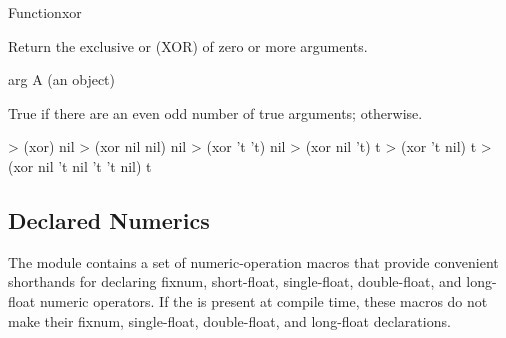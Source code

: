 \documentclass[10pt,twoside,english,pdftex]{article}
\begin{document}

\begin{functiondoc}{Function}{xor}{  
   \returns{} }

\fnsyntax

\fnpurpose Return the exclusive or (XOR) of zero or more arguments.

\fnpackage {}

\fnmodule {}

\fnargs
\begin{args}{arg}
\arg[arg] A  (an object)
\end{args}

\fnreturns True if there are an even odd number of true arguments; \nil{}
otherwise.

\fnexamples
\begin{example}
> (xor)
nil
> (xor nil nil)
nil
> (xor 't 't)
nil
> (xor nil 't)
t
> (xor 't nil)
t
> (xor nil 't nil 't 't nil)
t
\end{example}

\end{functiondoc}


\W\renewcommand{\subsubentities}{1}

\T\markright{}%
\T\pagestyle{plain}
\T\clearpage
\W{}
\T\pagestyle{fancy}
\T\thispagestyle{fancybottom}
\T\global\def\fnlastname{ }%
\subsection{Declared Numerics}
\label{sec:declared-numerics}%
\label{ent:incfAMP}%

%
%
%
%
%
%
%
%
The  module contains a set of
numeric-operation macros that provide convenient shorthands for
declaring fixnum, short-float, single-float, double-float, and
long-float numeric operators. If the 
\textbf{} is present at compile time, these
macros do not make their fixnum, single-float, double-float, and long-float
declarations.
\end{document}
